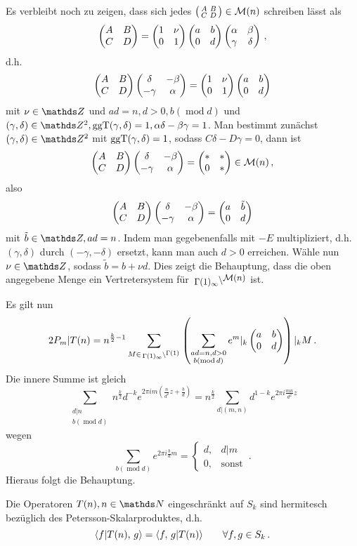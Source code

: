 \begin{bewe}
Es verbleibt noch zu zeigen, dass sich jedes $\mymat ABCD \in \mathcal M (n)$ schreiben lässt als
\[
	\mymat* ABCD = \mymat* 1\nu 01 \mymat* ab0d \mymat* \alpha \beta \gamma \delta
	\,,
\]
d.h. 
\[
	\mymat* ABCD \mymat* \delta{-\beta}{-\gamma}\alpha = \mymat* 1\nu 01 \mymat* ab0d
\]
mit $\nu \in \ZZ$ und $ad = n, d > 0, b (\operatorname{mod} d)$ und $(\gamma, \delta) \in \ZZ^2, \ggt(\gamma, \delta) = 1, \alpha\delta - \beta\gamma = 1$. Man bestimmt zunächst $(\gamma, \delta) \in \ZZ^2$ mit $\operatorname{ggT}(\gamma, \delta) = 1$, sodass $C\delta - D\gamma = 0$, dann ist
\[
	\mymat* ABCD \mymat* \delta{-\beta}{-\gamma}\alpha = \mymat* {*}{*}0{*} \in \mathcal M(n)
	\,,
\]
also
\[
	\mymat* ABCD \mymat* \delta{-\beta}{-\gamma}\alpha = \mymat* a{\tilde b}0d 
\]
mit $\tilde b \in \ZZ, ad = n$. Indem man gegebenenfalls mit $-E$ multipliziert, d.h. $(\gamma, \delta)$ durch $(-\gamma, -\delta)$ ersetzt, kann man auch $d > 0$ erreichen. Wähle nun $\nu \in \ZZ$, sodass $\tilde b = b + \nu d$. Dies zeigt die Behauptung, dass die oben angegebene Menge ein Vertretersystem für $\linksmodulo{\Gamma(1)_\infty}{\mathcal{M}(n)}$ ist.

Es gilt nun
\[
	2 P_m | T(n) = n^{\frac k2 - 1} \sum_{M \in \linksmodulo {\Gamma(1)_\infty}{\Gamma(1)}} \left( \sum_{\substack{ad = n, d > 0 \\ b (\operatorname{mod} d)}} e^m |_k \mymat* ab0d \right) |_k M
	\,.
\]
Die innere Summe ist gleich 
\[
	\sum_{\substack{d|n \\ b (\operatorname{mod} d)}} n^{\frac k2} d^{-k} e^{2\pi im \left( \frac {n}{d^2} z + \frac bd \right)} = n^{\frac k2} \sum_{d | (m,n)} d^{1-k} e^{2\pi i \frac {mn}{d^2} z}
\]
wegen 
\[
	\sum_{b (\operatorname{mod} d)} e^{2\pi i \frac bd m} = \begin{cases} d, &d|m \\ 0, &\text{sonst}\end{cases}
	\,.
\]
Hieraus folgt die Behauptung.
\end{bewe}

\begin{satz}\label{T(n)herm}
Die Operatoren $T(n), n \in \NN$ eingeschränkt auf $S_k$ sind hermitesch bezüglich des Petersson-Skalarproduktes, d.h.
\[
	\scalarprd {f|T(n)}g = \scalarprd f{g|T(n)} \qquad \forall f,g \in S_k
	\,.
\]
\end{satz}

